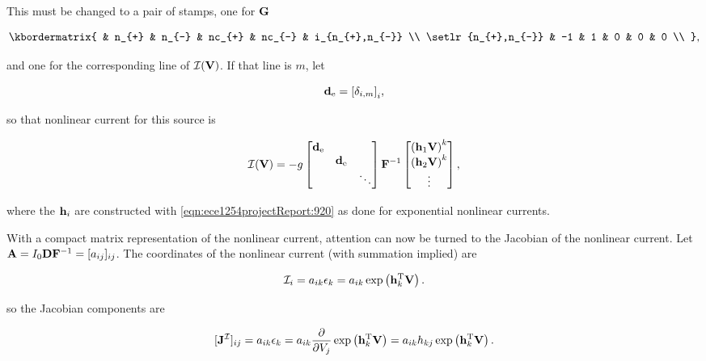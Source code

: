 This must be changed to a pair of stamps, one for \( \mathbf{G} \)

\begin{equation}\label{eqn:ece1254projectReport:1121}
\kbordermatrix{
        & n_{+} & n_{-} & nc_{+} & nc_{-} &  i_{n_{+},n_{-}} \\
\setlr{n_{+},n_{-}}        &    -1 & 1 & 0 & 0   & 0 \\
},
\end{equation}

and one for the corresponding line of \( \mathcal{I}(\mathbf{V}) \).  If that line is \( m \), let 

\begin{equation}\label{eqn:ece1254projectReport:1122}
\Bd_{\textrm{e}} = 
{[\delta_{i,m}]}_i,
\end{equation}

so that nonlinear current for this source is

\begin{equation}\label{eqn:ece1254projectReport:1124}
\mathcal{I}(\BV) = -g 
\begin{bmatrix}
\Bd_{\textrm{e}} &  &  \\
   & \Bd_{\textrm{e}} & \\
   &  & \ddots 
\end{bmatrix}
\BF^{-1}
\begin{bmatrix}
 \lr{\Bh_1 \BV}^k \\
 \lr{\Bh_2 \BV}^k \\
 \vdots
\end{bmatrix},
\end{equation}

where the \( \mathbf{h}_i \) are constructed with \cref{eqn:ece1254projectReport:920} as done for exponential nonlinear currents.


With a compact matrix representation of the nonlinear current, attention can now be turned to the Jacobian of the nonlinear current.
Let \( \mathbf{A} = I_0 \mathbf{D} \mathbf{F}^{-1} = [ a_{ij} ]_{ij} \).
The coordinates of the nonlinear current (with summation implied) are

\begin{dmath}\label{eqn:ece1254projectReport:1120}
\mathcal{I}_i = a_{ik} \epsilon_k = a_{ik} \exp\lr{ \Bh_k^\T \BV }.
\end{dmath}

so the Jacobian components are

\begin{dmath}\label{eqn:ece1254projectReport:1140}
[\BJ^{\mathcal{I}}]_{ij}
=
a_{ik} \epsilon_k = a_{ik}
\PD{V_j}{}
\exp\lr{ \Bh_k^\T \BV }
=
a_{ik}
h_{kj}
\exp\lr{ \Bh_k^\T \BV }.
\end{dmath}

